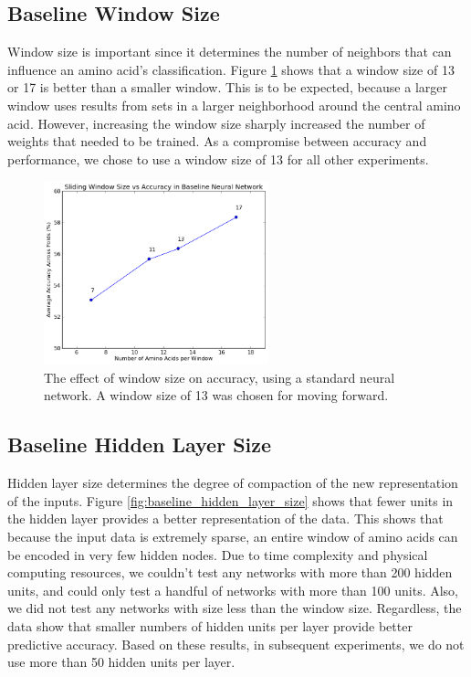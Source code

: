 \documentclass[letterpaper,twocolumn,12pt]{article}
\begin{document}
\subsection{Baseline Window Size}
Window size is important since it determines the number of neighbors that can influence an amino acid's classification.
Figure \ref{fig:baseline_window_size} shows that a window size of 13 or 17 is better than a smaller window.
This is to be expected, because a larger window uses results from sets in a larger neighborhood around the central amino acid.
However, increasing the window size sharply increased the number of weights that needed to be trained.
As a compromise between accuracy and performance, we chose to use a window size of 13 for all other experiments.

\begin{figure}[ht!]
\centering
\includegraphics[width=65mm]{results/baseline/baseline_windowSize.png}
\caption{The effect of window size on accuracy, using a standard neural network. A window size of 13 was chosen for moving forward.}
\label{fig:baseline_window_size}
\end{figure}

\subsection{Baseline Hidden Layer Size}
Hidden layer size determines the degree of compaction of the new representation of the inputs.
Figure \ref{fig:baseline_hidden_layer_size} shows that fewer units in the hidden layer provides a better representation of the data.
This shows that because the input data is extremely sparse, an entire window of amino acids can be encoded in very few hidden nodes.
Due to time complexity and physical computing resources, we couldn't test any networks with more than 200 hidden units, and could only test a handful of networks with more than 100 units.
Also, we did not test any networks with size less than the window size.
Regardless, the data show that smaller numbers of hidden units per layer provide better predictive accuracy.
Based on these results, in subsequent experiments, we do not use more than 50 hidden units per layer.
\end{document}
